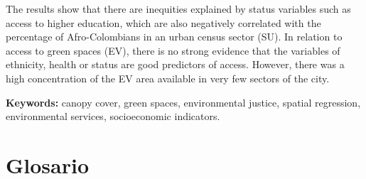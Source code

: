 \documentclass[12pt,a4paper,oneside, openany]{book}
\theoremstyle{definition}
\theoremstyle{definition}
\theoremstyle{definition}
\theoremstyle{remark}
\begin{document}
The results show that there are inequities explained by status variables
such as access to higher education, which are also negatively correlated
with the percentage of Afro-Colombians in an urban census sector (SU).
In relation to access to green spaces (EV), there is no strong evidence
that the variables of ethnicity, health or status are good predictors of
access. However, there was a high concentration of the EV area available
in very few sectors of the city.

\textbf{Keywords:} canopy cover, green spaces, environmental justice,
spatial regression, environmental services, socioeconomic indicators.


\setcounter{tocdepth}{2} \tableofcontents


\chapter*{Glosario}\label{glosario}
\end{document}
